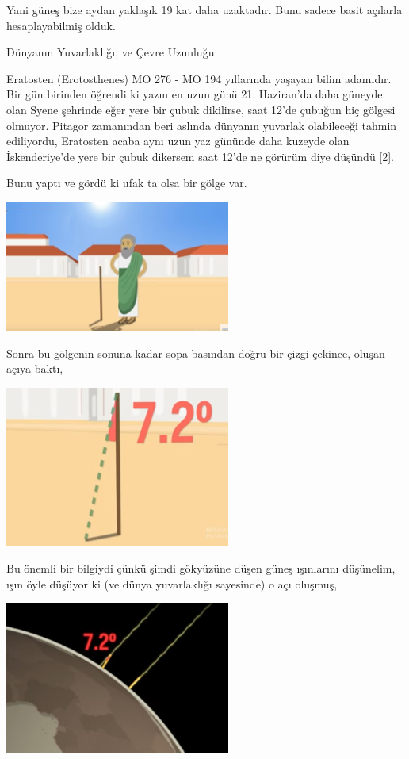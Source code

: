 \documentclass[12pt,fleqn]{article}\usepackage{../../common}
\begin{document}
Yani güneş bize aydan yaklaşık 19 kat daha uzaktadır. Bunu sadece basit açılarla
hesaplayabilmiş olduk.

Dünyanın Yuvarlaklığı, ve Çevre Uzunluğu

Eratosten (Erotosthenes) MO 276 - MO 194 yıllarında yaşayan bilim adamıdır. Bir
gün birinden öğrendi ki yazın en uzun günü 21. Haziran'da daha güneyde olan
Syene şehrinde eğer yere bir çubuk dikilirse, saat 12'de çubuğun hiç gölgesi
olmuyor. Pitagor zamanından beri aslında dünyanın yuvarlak olabileceği
tahmin ediliyordu, Eratosten acaba aynı uzun yaz gününde daha kuzeyde olan
İskenderiye'de yere bir çubuk dikersem saat 12'de ne görürüm diye düşündü [2].

Bunu yaptı ve gördü ki ufak ta olsa bir gölge var. 

\includegraphics[width=20em]{circum3.jpg}

Sonra bu gölgenin sonuna kadar sopa basından doğru bir çizgi çekince, oluşan
açıya baktı,

\includegraphics[width=20em]{circum4.jpg}

Bu önemli bir bilgiydi çünkü şimdi gökyüzüne düşen güneş ışınlarını düşünelim,
ışın öyle düşüyor ki (ve dünya yuvarlaklığı sayesinde) o açı oluşmuş, 

\includegraphics[width=20em]{circum1.jpg}
\end{document}
